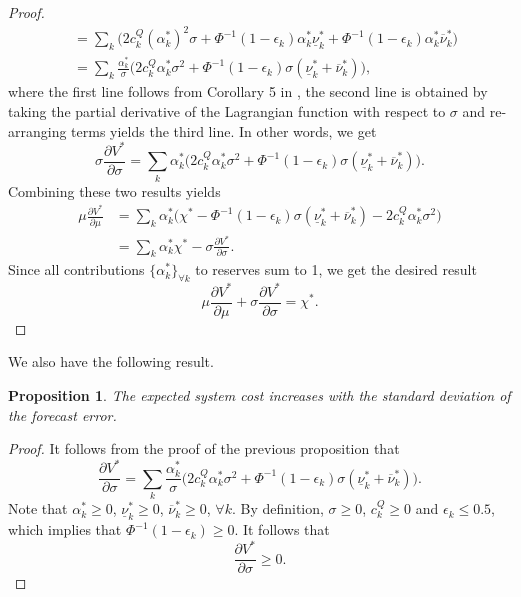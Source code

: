\documentclass{article}
\newtheorem{proposition}{Proposition}
\begin{document}
\begin{proof}
\begin{align*}
&= \sum_k\big(2c_k^Q(\alpha_k^*)^2\sigma + \Phi^{-1}(1-\epsilon_k) \alpha_k^* \underline{\nu}_k^* + \Phi^{-1}(1-\epsilon_k) \alpha_k^* \overline{\nu}_k^*\big)\\
&=\sum_k\frac{\alpha_k^*}{\sigma}\Big(2c_k^Q\alpha_k^*\sigma^2 + \Phi^{-1}(1-\epsilon_k) \sigma (\underline{\nu}_k^* + \overline{\nu}_k^*)\Big),
\end{align*}
where the first line follows from Corollary 5 in \cite{Milgrom2002}, the second line is obtained by taking the partial derivative of the Lagrangian function with respect to $\sigma$ and re-arranging terms yields the third line. In other words, we get
\begin{equation*}
\sigma \frac{\partial V^*}{\partial \sigma} = \sum_k \alpha_k^*\Big(2c_k^Q\alpha_k^*\sigma^2 + \Phi^{-1}(1-\epsilon_k) \sigma (\underline{\nu}_k^* + \overline{\nu}_k^*)\Big).
\end{equation*}
Combining these two results yields
\begin{align*}
\mu \frac{\partial V^*}{\partial \mu} &= \sum_k\alpha_k^*\Big(\chi^* - \Phi^{-1}(1-\epsilon_k) \sigma(\underline{\nu}_k^*+\overline{\nu}_k^*) - 2c_k^Q \alpha_k^* \sigma^2\Big)\\
&= \sum_k\alpha_k^*\chi^* - \sigma \frac{\partial V^*}{\partial \sigma}.
\end{align*}
Since all contributions $\{\alpha_k^*\}_{\forall k}$ to reserves sum to 1, we get the desired result
\begin{equation*}
\mu \frac{\partial V^*}{\partial \mu} + \sigma \frac{\partial V^*}{\partial \sigma} = \chi^*.
\end{equation*}
\end{proof}
We also have the following result.
\begin{proposition}
The expected system cost increases with the standard deviation of the forecast error.
\end{proposition}
\begin{proof}
It follows from the proof of the previous proposition that
\begin{equation*}
\frac{\partial V^*}{\partial \sigma} = \sum_k\frac{\alpha_k^*}{\sigma}\Big(2c_k^Q\alpha_k^*\sigma^2 + \Phi^{-1}(1-\epsilon_k) \sigma (\underline{\nu}_k^* + \overline{\nu}_k^*)\Big).
\end{equation*}
Note that $\alpha_k^* \ge 0$, $\underline{\nu}_k^* \ge 0$, $\overline{\nu}_k^* \ge 0$, $\forall k$. By definition, $\sigma \ge 0$, $c_k^Q \ge 0$ and $\epsilon_k \le 0.5$, which implies that $\Phi^{-1}(1-\epsilon_k) \ge 0$. It follows that
\begin{equation*}
\frac{\partial V^*}{\partial \sigma} \ge 0.
\end{equation*}
\end{proof}
\end{document}
